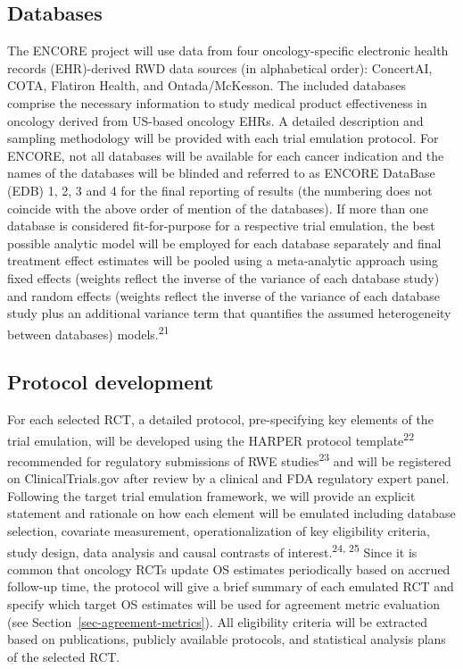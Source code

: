 \documentclass[
  letterpaper,
  DIV=11,
  numbers=noendperiod]{scrartcl}
\begin{document}
\subsection{Databases}\label{databases}

The ENCORE project will use data from four oncology-specific electronic
health records (EHR)-derived RWD data sources (in alphabetical order):
ConcertAI, COTA, Flatiron Health, and Ontada/McKesson. The included
databases comprise the necessary information to study medical product
effectiveness in oncology derived from US-based oncology EHRs. A
detailed description and sampling methodology will be provided with each
trial emulation protocol. For ENCORE, not all databases will be
available for each cancer indication and the names of the databases will
be blinded and referred to as ENCORE DataBase (EDB) 1, 2, 3 and 4 for
the final reporting of results (the numbering does not coincide with the
above order of mention of the databases). If more than one database is
considered fit-for-purpose for a respective trial emulation, the best
possible analytic model will be employed for each database separately
and final treatment effect estimates will be pooled using a
meta-analytic approach using fixed effects (weights reflect the inverse
of the variance of each database study) and random effects (weights
reflect the inverse of the variance of each database study plus an
additional variance term that quantifies the assumed heterogeneity
between databases) models.\textsuperscript{21}

\subsection{Protocol development}\label{protocol-development}

For each selected RCT, a detailed protocol, pre-specifying key elements
of the trial emulation, will be developed using the HARPER protocol
template\textsuperscript{22} recommended for regulatory submissions of
RWE studies\textsuperscript{23} and will be registered on
ClinicalTrials.gov after review by a clinical and FDA regulatory expert
panel. Following the target trial emulation framework, we will provide
an explicit statement and rationale on how each element will be emulated
including database selection, covariate measurement, operationalization
of key eligibility criteria, study design, data analysis and causal
contrasts of interest.\textsuperscript{24, 25} Since it is common that
oncology RCTs update OS estimates periodically based on accrued
follow-up time, the protocol will give a brief summary of each emulated
RCT and specify which target OS estimates will be used for agreement
metric evaluation (see Section~\ref{sec-agreement-metrics}). All
eligibility criteria will be extracted based on publications, publicly
available protocols, and statistical analysis plans of the selected RCT.
\end{document}
